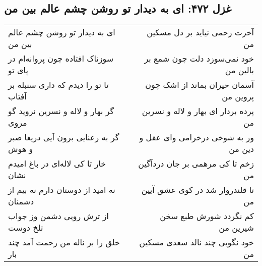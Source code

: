 \begin{center}
\section*{غزل ۴۷۲: ای به دیدار تو روشن چشم عالم بین من}
\label{sec:472}
\begin{longtable}{l p{0.5cm} r}
ای به دیدار تو روشن چشم عالم بین من
&&
آخرت رحمی نیاید بر دل مسکین من
\\
سوزناک افتاده چون پروانه‌ام در پای تو
&&
خود نمی‌سوزد دلت چون شمع بر بالین من
\\
تا تو را دیدم که داری سنبله بر آفتاب
&&
آسمان حیران بماند از اشک چون پروین من
\\
گر بهار و لاله و نسرین نروید گو مروی
&&
پرده بردار ای بهار و لاله و نسرین من
\\
گر به رعنایی برون آیی دریغا صبر و هوش
&&
ور به شوخی درخرامی وای عقل و دین من
\\
خار تا کی لاله‌ای در باغ امیدم نشان
&&
زخم تا کی مرهمی بر جان دردآگین من
\\
نه امید از دوستان دارم نه بیم از دشمنان
&&
تا قلندروار شد در کوی عشق آیین من
\\
از ترش رویی دشمن وز جواب تلخ دوست
&&
کم نگردد شورش طبع سخن شیرین من
\\
خلق را بر ناله من رحمت آمد چند بار
&&
خود نگویی چند نالد سعدی مسکین من
\\
\end{longtable}
\end{center}

